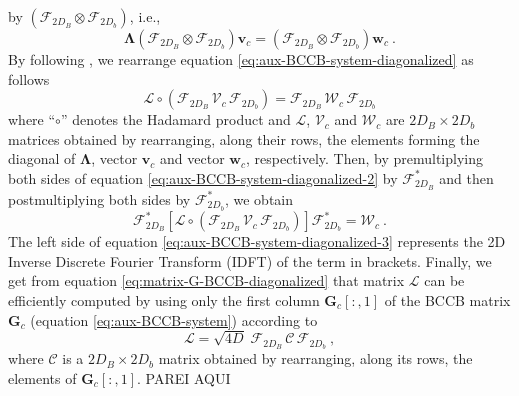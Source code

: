by $\left(\boldsymbol{\mathcal{F}}_{2D_{B}} \otimes \boldsymbol{\mathcal{F}}_{2D_{b}} \right)$, i.e.,
\begin{equation}
	\boldsymbol{\Lambda} \left(\boldsymbol{\mathcal{F}}_{2D_{B}} \otimes \boldsymbol{\mathcal{F}}_{2D_{b}} \right) 
	\mathbf{v}_{c} = \left(\boldsymbol{\mathcal{F}}_{2D_{B}} \otimes \boldsymbol{\mathcal{F}}_{2D_{b}} \right) 
	\mathbf{w}_{c} \: .
	\label{eq:aux-BCCB-system-diagonalized}
\end{equation}
By following \citet{takahashi-etal2020}, we rearrange equation \ref{eq:aux-BCCB-system-diagonalized} as follows
\begin{equation}
	\boldsymbol{\mathcal{L}} \circ 
	\left( \boldsymbol{\mathcal{F}}_{2D_{B}} \, \boldsymbol{\mathcal{V}}_{c} \, \boldsymbol{\mathcal{F}}_{2D_{b}} \right) = 
	\boldsymbol{\mathcal{F}}_{2D_{B}} \, \boldsymbol{\mathcal{W}}_{c} \, \boldsymbol{\mathcal{F}}_{2D_{b}}
	\label{eq:aux-BCCB-system-diagonalized-2}
\end{equation}
where ``$\circ$'' denotes the Hadamard product \cite[e.g.,][p. 298]{horn-johnson1991} and 
$\boldsymbol{\mathcal{L}}$, $\boldsymbol{\mathcal{V}}_{c}$ and $\boldsymbol{\mathcal{W}}_{c}$ are 
$2D_{B} \times 2D_{b}$ matrices obtained 
by rearranging, along their rows, the elements forming the diagonal of 
$\boldsymbol{\Lambda}$, vector $\mathbf{v}_{c}$ and vector $\mathbf{w}_{c}$, respectively.
Then, by premultiplying both sides of equation \ref{eq:aux-BCCB-system-diagonalized-2} 
by $\boldsymbol{\mathcal{F}}_{2D_{B}}^{\ast}$ and then postmultiplying both sides by 
$\boldsymbol{\mathcal{F}}_{2D_{b}}^{\ast}$, we obtain
\begin{equation}
	\boldsymbol{\mathcal{F}}_{2D_{B}}^{\ast} \left[ \boldsymbol{\mathcal{L}} \circ 
	\left( \boldsymbol{\mathcal{F}}_{2D_{B}} \, \boldsymbol{\mathcal{V}}_{c} \, \boldsymbol{\mathcal{F}}_{2D_{b}} \right)
	\right] \boldsymbol{\mathcal{F}}_{2D_{b}}^{\ast} = \boldsymbol{\mathcal{W}}_{c} \: .
	\label{eq:aux-BCCB-system-diagonalized-3}
\end{equation}
The left side of equation \ref{eq:aux-BCCB-system-diagonalized-3} represents the 2D 
Inverse Discrete Fourier Transform (IDFT) of the term in brackets.
Finally, we get from equation \ref{eq:matrix-G-BCCB-diagonalized} that 
matrix $\boldsymbol{\mathcal{L}}$ can be efficiently computed by using only the first column 
$\mathbf{G}_{c}[:,1]$ of the BCCB matrix $\mathbf{G}_{c}$ (equation \ref{eq:aux-BCCB-system})
according to \citep{takahashi-etal2020}
\begin{equation}
	\boldsymbol{\mathcal{L}} = \sqrt{4D} \; 
	\boldsymbol{\mathcal{F}}_{2D_{B}} \, \boldsymbol{\mathcal{C}} \, \boldsymbol{\mathcal{F}}_{2D_{b}} \: ,
	\label{eq:matrix-L}
\end{equation}
where $\boldsymbol{\mathcal{C}}$ is a $2D_{B} \times 2D_{b}$ matrix obtained 
by rearranging, along its rows, the elements of $\mathbf{G}_{c}[:,1]$. PAREI AQUI

